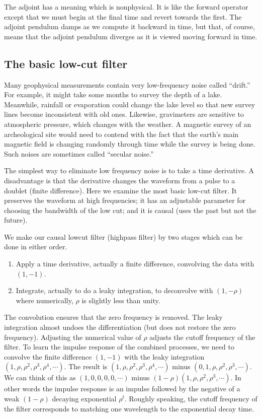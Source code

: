 \par
The adjoint has a meaning which is nonphysical.
It is like the forward operator except that we must
begin at the final time and revert towards the first.
The adjoint pendulum damps as we compute it backward in time,
but that, of course, means that the adjoint pendulum diverges
as it is viewed moving forward in time.


\subsection{The basic low-cut filter}
Many geophysical measurements contain
very low-frequency noise called ``drift.''
For example, it might take some months to survey the depth of a lake.
Meanwhile, rainfall or evaporation could change the lake level so that
new survey lines become inconsistent with old ones.
Likewise, gravimeters are sensitive to atmospheric pressure,
which changes with the weather.
A magnetic survey of an archeological site would need to contend
with the fact that the earth's main magnetic field is changing randomly
through time while the survey is being done.
Such noises are sometimes called ``secular noise.''

\par
The simplest way to eliminate low frequency noise is
to take a time derivative.
A disadvantage is that the derivative
changes the waveform
from a pulse to a doublet (finite difference).
Here we examine the most basic low-cut filter.
It preserves the waveform at high frequencies;
it has an adjustable parameter
for choosing the bandwidth of the low cut;
and it is causal (uses the past but not the future).

\par
We make our causal lowcut filter (highpass filter) by
two stages which can be done in either order.
\begin{enumerate}
\item
        Apply a time derivative, actually a finite
        difference, convolving the data with $(1,-1)$.
\item
        Integrate, actually to do a leaky integration,
        to deconvolve with $(1,-\rho)$ where numerically,
        $\rho$ is slightly less than unity.
\end{enumerate}
The convolution ensures that the zero frequency is removed.
The leaky integration almost undoes the differentiation
(but does not restore the zero frequency).
Adjusting the numerical value of $\rho$ adjusts
the cutoff frequency of the filter.
To learn the impulse response of the combined processes, we
need to convolve the finite difference $(1,-1)$
with the leaky integration 
$(1, \rho, \rho^2, \rho^3, \rho^4, \cdots)$.
The result is
$(   1, \rho, \rho^2, \rho^3, \rho^4, \cdots)$ minus
$(0, 1, \rho, \rho^2, \rho^3,         \cdots)$.
We can think of this as
$(1,    0,      0,      0,      0, \cdots)$ minus
$(1-\rho) (1, \rho, \rho^2, \rho^3, \cdots)$.
In other words the impulse response is an impulse
followed by the negative of a weak $(1-\rho)$ decaying exponential $\rho^t$.
Roughly speaking, the cutoff frequency of the filter corresponds
to matching one wavelength to the exponential decay time.

